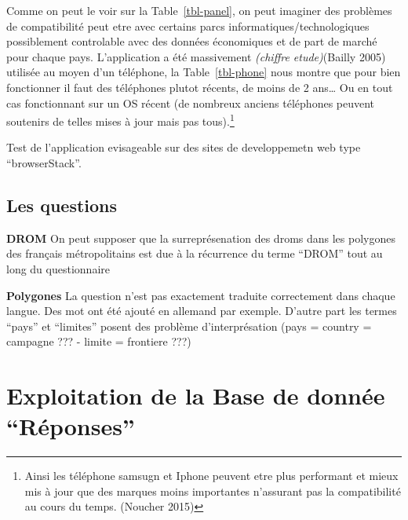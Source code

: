 \documentclass[
  12pt,
  a4paperpaper,
]{book}
\begin{document}
Comme on peut le voir sur la Table~\ref{tbl-panel}, on peut imaginer des
problèmes de compatibilité peut etre avec certains parcs
informatiques/technologiques possiblement controlable avec des données
économiques et de part de marché pour chaque pays. L'application a été
massivement \emph{(chiffre etude)}(Bailly 2005) utilisée au moyen d'un
téléphone, la Table~\ref{tbl-phone} nous montre que pour bien
fonctionner il faut des téléphones plutot récents, de moins de 2
ans\ldots{} Ou en tout cas fonctionnant sur un OS récent (de nombreux
anciens téléphones peuvent soutenirs de telles mises à jour mais pas
tous).\footnote{Ainsi les téléphone samsugn et Iphone peuvent etre plus
  performant et mieux mis à jour que des marques moins importantes
  n'assurant pas la compatibilité au cours du temps. (Noucher 2015)}

Test de l'application evisageable sur des sites de developpemetn web
type ``browserStack''.

\hypertarget{les-questions}{%
\subsection{Les questions}\label{les-questions}}

\textbf{DROM} On peut supposer que la surreprésenation des droms dans
les polygones des français métropolitains est due à la récurrence du
terme ``DROM'' tout au long du questionnaire

\textbf{Polygones} La question n'est pas exactement traduite
correctement dans chaque langue. Des mot ont été ajouté en allemand par
exemple. D'autre part les termes ``pays'' et ``limites'' posent des
problème d'interprésation (pays = country = campagne ??? - limite =
frontiere ???)

\hypertarget{exploitation-de-la-base-de-donnuxe9e-ruxe9ponses}{%
\section{Exploitation de la Base de donnée
``Réponses''}\label{exploitation-de-la-base-de-donnuxe9e-ruxe9ponses}}
\end{document}
